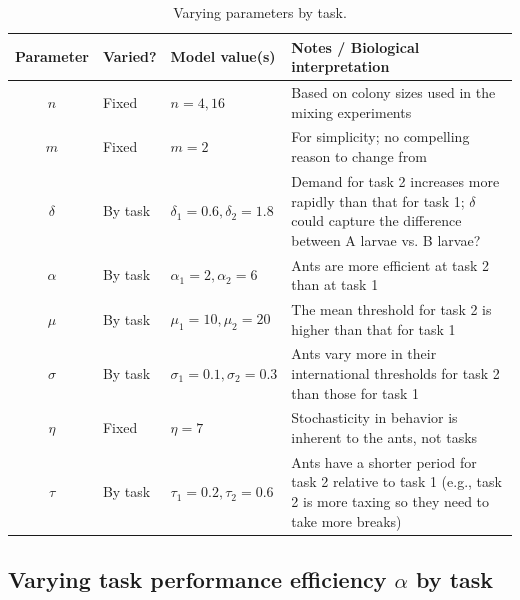\documentclass[11pt]{article}
\begin{document}
\begin{appendices}
\begin{table}[H] \small
  \begin{center}
    \begin{tabular}{|c|>{\centering}m{0.65in}|>{\centering}m{1.15in}|m{3.5in}|} 
      \hline
      \textbf{Parameter} & \textbf{Varied?} & \textbf{Model value(s)} & \textbf{Notes / Biological interpretation} \\ \hline
      $n$ & Fixed & $n = 4, 16$ & Based on colony sizes used in the mixing experiments \\ \hline
      $m$ & Fixed & $m = 2$ & For simplicity; no compelling reason to change from \cite{ulrich2018} \\ \hline
      $\delta$ & By task & $\delta_1 = 0.6, \delta_2 = 1.8 $ & Demand for task 2 increases more rapidly than that for task 1; $\delta$ could capture the difference between A larvae vs. B larvae? \\ \hline
      $\alpha$ & By task  & $\alpha_1 = 2,\alpha_2 = 6$ & Ants are more efficient at task 2 than at task 1 \\ \hline
      $\mu$ & By task  & $\mu_1 = 10,\mu_2 = 20 $ & The mean threshold for task 2 is higher than that for task 1\\ \hline
      $\sigma$ & By task & $\sigma_1 = 0.1, \sigma_2 = 0.3$ & Ants vary more in their international thresholds for task 2 than those for task 1 \\ \hline
      $\eta$ & Fixed & $\eta = 7$ & Stochasticity in behavior is inherent to the ants, not tasks\\ \hline
      $\tau$ & By task & $\tau_1 = 0.2,\tau_2 = 0.6 $ & Ants have a shorter period for task 2 relative to task 1 (e.g., task 2 is more taxing so they need to take more breaks) \\ \hline
    \end{tabular}
    \caption{Varying parameters by task.}
    \label{tab:table3}
  \end{center}
\end{table}

\subsection{Varying task performance efficiency $\alpha$ by task}


\end{appendices}
\end{document}

